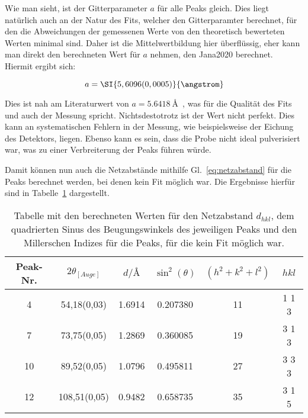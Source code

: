 Wie man sieht, ist der Gitterparameter $a$ für alle Peaks gleich. Dies liegt natürlich auch an der Natur des Fits, welcher den Gitterparamter berechnet, für den die Abweichungen der gemessenen Werte von den theoretisch bewerteten Werten minimal sind. Daher ist die Mittelwertbildung hier überflüssig, eher kann man direkt den berechneten Wert für $a$ nehmen, den Jana2020 berechnet. Hiermit ergibt sich:

\begin{equation}
    a = \SI{5,6096(0,0005)}{\angstrom}
\end{equation}

Dies ist nah am Literaturwert von $a = \SI[]{5,6418}[]{\angstrom}$~\cite{fon}, was für die Qualität des Fits und auch der Messung spricht. Nichtsdestotrotz ist der Wert nicht perfekt. Dies kann an systematischen Fehlern in der Messung, wie beispielsweise der Eichung des Detektors, liegen. Ebenso kann es sein, dass die Probe nicht ideal pulverisiert war, was zu einer Verbreiterung der Peaks führen würde.

Damit können nun auch die Netzabstände mithilfe Gl.~\ref{eq:netzabstand} für die Peaks berechnet werden, bei denen kein Fit möglich war. Die Ergebnisse hierfür sind in Tabelle~\ref{tab:gitter2} dargestellt.

\begin{table}[h!]
    \centering
     \begin{tabular}{|c|c|c|c|c|c|} 
     \hline
     Peak-Nr. & $2\theta_{[Auge]}$ & $d/\si{\angstrom}$ & $\sin^2(\theta)$ & $(h^2+k^2+l^2)$&  $h k l $ \\ [0.5ex] 
     \hline\hline
     4 & \num{54,18(0,03)} & 1.6914 & 0.207380 & 11 & 1 1 3 \\
     7 & \num{73,75(0,05)} & 1.2869 & 0.360085 & 19 & 3 1 3\\
     10 & \num{89,52(0,05)}  & 1.0796 & 0.495811 & 27 & 3 3 3 \\
     12 & \num{108,51(0,05)} & 0.9482 & 0.658735 & 35 & 3 1 5 \\
     [1ex] 
     \hline
     \end{tabular}
     \caption[short]{Tabelle mit den berechneten Werten für den Netzabstand $d_{hkl}$, dem quadrierten Sinus des Beugungswinkels des jeweiligen Peaks und den Millerschen Indizes für die Peaks, für die kein Fit möglich war.}
     \label{tab:gitter2}
\end{table}